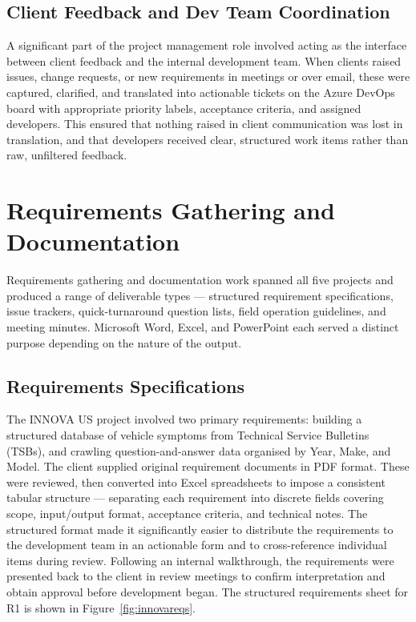 \subsection{Client Feedback and Dev Team Coordination}

A significant part of the project management role involved acting as the interface between client feedback and the internal development team. When clients raised issues, change requests, or new requirements in meetings or over email, these were captured, clarified, and translated into actionable tickets on the Azure DevOps board with appropriate priority labels, acceptance criteria, and assigned developers. This ensured that nothing raised in client communication was lost in translation, and that developers received clear, structured work items rather than raw, unfiltered feedback.

\section{Requirements Gathering and Documentation}

Requirements gathering and documentation work spanned all five projects and produced a range of deliverable types — structured requirement specifications, issue trackers, quick-turnaround question lists, field operation guidelines, and meeting minutes. Microsoft Word, Excel, and PowerPoint each served a distinct purpose depending on the nature of the output.

\subsection{Requirements Specifications}

The INNOVA US project involved two primary requirements: building a structured database of vehicle symptoms from Technical Service Bulletins (TSBs), and crawling question-and-answer data organised by Year, Make, and Model. The client supplied original requirement documents in PDF format. These were reviewed, then converted into Excel spreadsheets to impose a consistent tabular structure — separating each requirement into discrete fields covering scope, input/output format, acceptance criteria, and technical notes. The structured format made it significantly easier to distribute the requirements to the development team in an actionable form and to cross-reference individual items during review. Following an internal walkthrough, the requirements were presented back to the client in review meetings to confirm interpretation and obtain approval before development began. The structured requirements sheet for R1 is shown in Figure~\ref{fig:innovareqs}.

